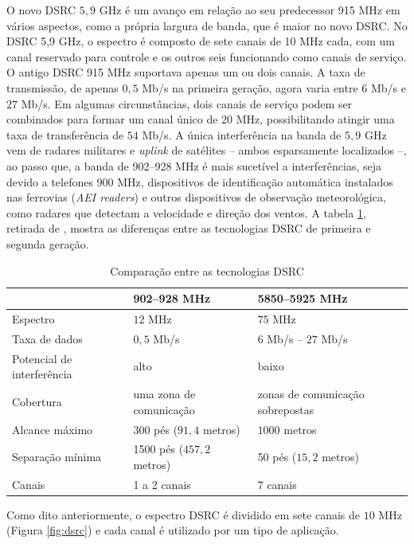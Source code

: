 O novo DSRC $5,9$ GHz é um avanço em relação ao seu predecessor 915 MHz em
vários aspectos, como a própria largura de banda, que é maior no novo DSRC. No
DSRC 5,9 GHz, o espectro é composto de sete canais de 10 MHz cada, com um canal
reservado para controle e os outros seis funcionando como canais de serviço. O
antigo DSRC 915 MHz suportava apenas um ou dois canais. A taxa de transmissão,
de apenas $0,5$ Mb/s na primeira geração, agora varia entre $6$ Mb/s e $27$
Mb/s. Em algumas circunstâncias, dois canais de serviço podem ser combinados
para formar um canal único de 20 MHz, possibilitando atingir uma taxa de
transferência de $54$ Mb/s. A única interferência na banda de $5,9$ GHz vem de
radares militares e \textit{uplink} de satélites -- ambos esparsamente
localizados --, ao passo que, a banda de 902--928 MHz é mais sucetível a
interferências, seja devido a telefones 900 MHz, dispositivos de identificação
automática instalados nas ferrovias (\textit{AEI readers}) e outros dispositivos
de observação meteorológica, como radares que detectam a velocidade e direção
dos ventos.  A tabela \ref{tab:dsrccomparison}, retirada de \cite{guo2006vehicular},
mostra as diferenças entre as tecnologias DSRC de primeira e segunda geração.

\begin{table}[htbp]
		\centering
		\begin{tabular}{l l l}
		\toprule
		& 902--928 MHz & 5850--5925 MHz\\
		\midrule
		Espectro & $12$ MHz & $75$ MHz\\
		Taxa de dados  & $0,5$ Mb/s & $6$ Mb/s -- $27$ Mb/s \\
		Potencial de interferência & alto & baixo \\
		Cobertura & uma zona de comunicação & zonas de comunicação sobrepostas\\
		Alcance máximo & $300$ pés ($91,4$ metros) & $1000$ metros\\
		Separação mínima & 1500 pés ($457,2$ metros) & 50 pés ($15,2$ metros)\\
		Canais & 1 a 2 canais & 7 canais\\
		\bottomrule
		\end{tabular}
\caption{Comparação entre as tecnologias DSRC}
 \label{tab:dsrccomparison}
\end{table}

Como dito anteriormente, o espectro DSRC é dividido em sete canais
de $10$ MHz (Figura \ref{fig:dsrc}) e cada canal é utilizado por um
tipo de aplicação.


